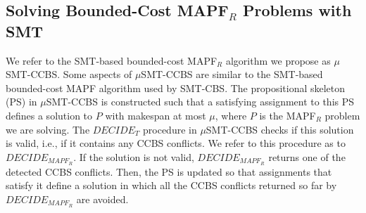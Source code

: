 \documentclass[review]{elsarticle}
\newcommand{\decidet}{\ensuremath{\mathit{DECIDE_T}}\xspace}
\newcommand{\decidemapfr}{\ensuremath{\mathit{DECIDE_{MAPF_R}}}\xspace}
\newcommand\konstantin[1]{\nb{\textbf{Konstantin:}}{red}{#1}}
\newcommand{\smt}{\ac{SMT}\xspace}
\newcommand{\ccbs}{\ac{CCBS}\xspace}
\newcommand{\ps}{\ac{PS}\xspace}
\newcommand{\mapfr}{\ac{MAPF}$_R$\xspace}
\newcommand{\smtcbsO}{SMT-CBS\xspace} %
\newcommand{\smtccbs}{SMT-CCBS\xspace}
\newcommand{\mapf}{\ac{MAPF}\xspace}
\begin{document}



\subsection{Solving Bounded-Cost \mapfr Problems with \smt}
\label{sec:smt-fixed}


We refer to the \smt-based bounded-cost \mapfr algorithm we propose as $\mu$\smtccbs. 
Some aspects of $\mu$\smtccbs are similar to the \smt-based bounded-cost \mapf algorithm used by \smtcbsO. 
The propositional skeleton (\ps) in $\mu$\smtccbs is constructed such that a 
satisfying assignment to this \ps defines a solution to $P$ with makespan at most $\mu$, 
where $P$ is the \mapfr problem we are solving. 
The \decidet procedure in $\mu$\smtccbs checks if this solution is valid, i.e., if it contains any \ccbs conflicts. 
We refer to this procedure as to \decidemapfr .
If the solution is not valid, \decidemapfr returns one of the detected \ccbs conflicts. 
Then, the \ps is updated so that assignments that satisfy it 
define a solution in which all the \ccbs conflicts returned so far by \decidemapfr are avoided. 
\end{document}
